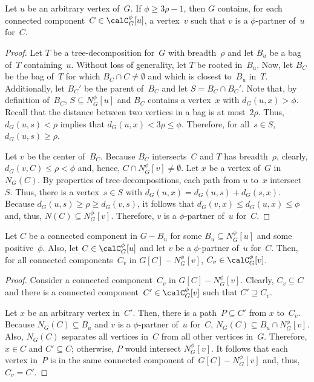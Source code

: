 \begin{lemma}
    \label{lem:potPartnerInCC}
Let \( u \) be an arbitrary vertex of~\( G \).
If \( \phi \geq 3 \rho - 1 \), then \( G \) contains, for each connected component~\( C \in \calC_G^\phi[u] \), a vertex~\( v \) such that \( v \) is a \( \phi \)-partner of~\( u \) for~\( C \).
\end{lemma}

\begin{proof}
Let $T$ be a tree-decomposition for~$G$ with breadth~$\rho$ and let $B_u$ be a bag of~$T$ containing~$u$.
Without loss of generality, let $T$ be rooted in~$B_u$.
Now, let $B_C$ be the bag of~$T$ for which $B_C \cap C \neq \emptyset$ and which is closest to~$B_u$ in~$T$.
Additionally, let $B_C'$ be the parent of~$B_C$ and let $S = B_C \cap B_C'$.
Note that, by definition of~$B_C$, $S \subseteq N_G^\phi[u]$ and $B_C$ contains a vertex~$x$ with $d_G(u, x) > \phi$.
Recall that the distance between two vertices in a bag is at most~$2 \rho$.
Thus, $d_G(u, s) < \rho$ implies that $d_G(u, x) < 3 \rho \leq \phi$.
Therefore, for all~$s \in S$, $d_G(u, s) \geq \rho$.

Let $v$ be the center of~$B_C$.
Because $B_C$ intersects~$C$ and $T$ has breadth~$\rho$, clearly, $d_G(v, C) \leq \rho < \phi$ and, hence, $C \cap N_G^\phi[v] \neq \emptyset$.
Let $x$ be a vertex of~$G$ in $N_G(C)$.
By properties of tree-decompositions, each path from $u$ to~$x$ intersect~$S$.
Thus, there is a vertex~$s \in S$ with $d_G(u, x) = d_G(u, s) + d_G(s, x)$.
Because $d_G(u, s) \geq \rho \geq d_G(v, s)$, it follows that $d_G(v, x) \leq d_G(u, x) \leq \phi$ and, thus, $N(C) \subseteq N_G^\phi[v]$.
Therefore, $v$ is a $\phi$-partner of~$u$ for~$C$.
\end{proof}

\begin{lemma}
    \label{lem:potPartnerKeepCCs}
Let \( C \) be a connected component in \( G - B_u \) for some \( B_u \subseteq N_G^\phi[u] \) and some positive~\( \phi \).
Also, let  \( C \in \calC_G^\phi[u] \) and let \( v \) be a \( \phi \)-partner of~\( u \) for~\( C \).
Then, for all connected components~\( C_v \) in \( G[C] - N_G^\phi[v] \), \( C_v \in \calC_G^\phi[v] \).
\end{lemma}

\begin{proof}
Consider a connected component~$C_v$ in $G[C] - N_G^\phi[v]$.
Clearly, $C_v \subseteq C$ and there is a connected component~$C' \in \calC_G^\phi[v]$ such that $C' \supseteq C_v$.

Let $x$ be an arbitrary vertex in~$C'$.
Then, there is a path~$P \subseteq C'$ from $x$ to~$C_v$.
Because $N_G(C) \subseteq B_u$ and $v$ is a $\phi$-partner of~$u$ for~$C$, $N_G(C) \subseteq B_u \cap N_G^\phi[v]$.
Also, $N_G(C)$ separates all vertices in~$C$ from all other vertices in~$G$.
Therefore, $x \in C$ and $C' \subseteq C$; otherwise, $P$ would intersect $N_G^\phi[v]$.
It follows that each vertex in~$P$ is in the same connected component of~$G[C] - N_G^\phi[v]$ and, thus, $C_v = C'$.
\end{proof}

